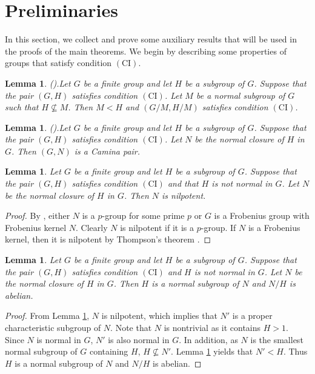 \documentclass[twoside,a4paper,reqno,11pt]{amsart}
\newcommand{\<}{\langle}
\renewcommand{\>}{\rangle}
\newcommand{\CI}{\mathrm{(CI)}}
\renewcommand{\:}{\colon}
\newtheorem{lem}[thm]{Lemma}
\theoremstyle{definition}
\begin{document}
\section{Preliminaries}


In this section, we collect and prove some auxiliary results that will be used in the proofs of the main theorems. We begin by describing some  properties of groups that satisfy condition $\CI$.



\begin{lem}\emph{(\cite[Lemma 1.3]{Kuisch-vanderWaall}).}\label{lemma1.3}
Let $G$ be a finite group and let $H$ be a subgroup of $G$. Suppose that the pair $(G,H)$ satisfies condition $\CI$. Let $M$ be a normal subgroup of $G$ such that  $H\not\subseteq M$. Then $M <H$ and $(G/M, H/M)$ satisfies condition $\CI$. 
\end{lem}

\begin{lem} \emph{(\cite[Theorem 3.2]{Kuisch-vanderWaall}).}\label{lem:Cam}
Let $G$ be a finite group and let $H$ be a subgroup of $G$.	Suppose that  the pair $(G,H)$ satisfies condition $\CI$. Let $N$ be the normal closure of $H$ in $G$. Then $(G,N)$ is a Camina pair. 
\end{lem}

\begin{lem}\label{thm4.1}
Let $G$ be a finite group and let $H$ be a subgroup of $G$.	Suppose that  the pair $(G,H)$ satisfies condition $\CI$ and that $H$ is not normal in $G$. Let $N$ be the normal closure of $H$ in $G$. Then $N$ is nilpotent.
\end{lem}
\begin{proof}
	By \cite[Theorem 4.1]{Kuisch-vanderWaall}, either $N$ is a $p$-group for some prime $p$ or $G$ is a Frobenius group with Frobenius kernel $N.$ Clearly $N$ is nilpotent if it is a $p$-group. If  $N$ is a Frobenius kernel, then it is nilpotent by Thompson's theorem \cite[Theorem 1]{Thompson}.  
\end{proof}


\begin{lem} \label{Hnormal}
Let $G$ be a finite group and let $H$ be a subgroup of $G$.	Suppose that the pair $(G,H)$ satisfies condition $\CI$ and $H$ is not normal in $G$. Let $N$ be the normal closure of $H$ in $G$. Then  $H$ is a normal subgroup of $N$ and $N/H$ is abelian. 
\end{lem}
\begin{proof}
	From Lemma \ref{thm4.1},  $N$ is nilpotent, which implies that $N'$ is a proper characteristic subgroup of $N$. Note that $N$ is nontrivial as it contains $H>1$. Since $N$ is normal in $G$, $N'$ is also normal in $G$. In addition, as $N$ is the smallest normal subgroup of $G$ containing $H$, $H\nsubseteq N'$.  Lemma \ref{lemma1.3} yields that  $N' < H$. Thus $H$ is a normal subgroup of $N$ and  $N/H$ is abelian. 
\end{proof}
\end{document}
